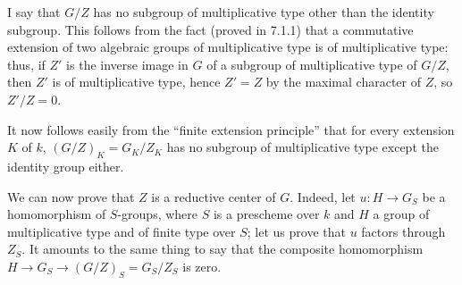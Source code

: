 I say that $G/Z$ has no subgroup of multiplicative type other than the identity subgroup. This follows from the fact (proved in 7.1.1) that a commutative extension of two algebraic groups of multiplicative type is of multiplicative type: thus, if $Z'$ is the inverse image in $G$ of a subgroup of multiplicative type of $G/Z$, then $Z'$ is of multiplicative type, hence $Z'=Z$ by the maximal character of $Z$, so $Z'/Z=0$.

It now follows easily from the ``finite extension principle'' that for every extension $K$ of $k$, $(G/Z)_K=G_K/Z_K$ has no subgroup of multiplicative type except the identity group either.

We can now prove that $Z$ is a reductive center of $G$. Indeed, let $u:H\to G_S$ be a homomorphism of $S$-groups, where $S$ is a prescheme over $k$ and $H$ a group of multiplicative type and of finite type over $S$; let us prove that $u$ factors through $Z_S$. It amounts to the same thing to say that the composite homomorphism $H\to G_S\to(G/Z)_S=G_S/Z_S$ is zero.

